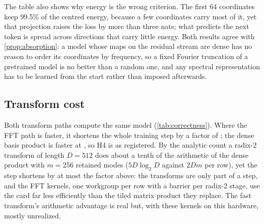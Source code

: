 The table also shows why energy is the wrong criterion. The first 64
coordinates keep 99.5\% of the centred energy, because a few coordinates
carry most of it, yet that projection raises the loss by more than three
nats; what predicts the next token is spread across directions that carry
little energy. Both results agree with \cref{prop:absorption}: a model whose
maps on the residual stream are dense has no reason to order its coordinates
by frequency, so a fixed Fourier truncation of a pretrained model is no
better than a random one, and any spectral representation has to be learned
from the start rather than imposed afterwards.

\subsection{Transform cost}
\label{sec:res-systems}



Both transform paths compute the same model (\cref{tab:correctness}). Where
the FFT path is faster, it shortens the whole training step by a factor of
\FftGainRange{}; the dense basis product is faster at \DenseWins{}, so H4 is
\HFourVerdict{} as registered. By the analytic count a radix-2 transform of
length $D=512$ does about a tenth of the arithmetic of the dense product with
$m=256$ retained modes ($5D\log_2 D$ against $2Dm$ per row), yet the step
shortens by at most the factor above: the transforms are only part of a step,
and the FFT kernels, one workgroup per row with a barrier per radix-2 stage,
use the card far less efficiently than the tiled matrix product they replace.
The fast transform's arithmetic advantage is real but, with these kernels on
this hardware, mostly unrealized.
